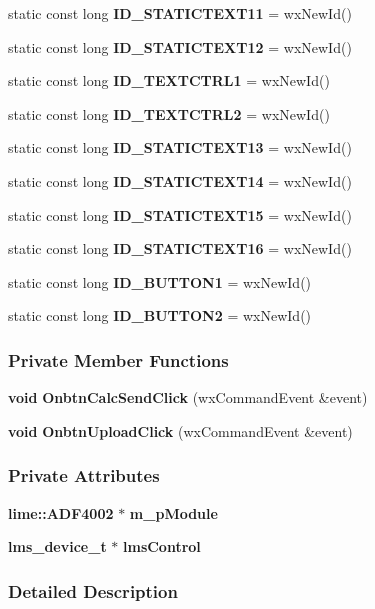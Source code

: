 \begin{DoxyCompactItemize}
\item 
static const long {\bf I\+D\+\_\+\+S\+T\+A\+T\+I\+C\+T\+E\+X\+T11} = wx\+New\+Id()
\item 
static const long {\bf I\+D\+\_\+\+S\+T\+A\+T\+I\+C\+T\+E\+X\+T12} = wx\+New\+Id()
\item 
static const long {\bf I\+D\+\_\+\+T\+E\+X\+T\+C\+T\+R\+L1} = wx\+New\+Id()
\item 
static const long {\bf I\+D\+\_\+\+T\+E\+X\+T\+C\+T\+R\+L2} = wx\+New\+Id()
\item 
static const long {\bf I\+D\+\_\+\+S\+T\+A\+T\+I\+C\+T\+E\+X\+T13} = wx\+New\+Id()
\item 
static const long {\bf I\+D\+\_\+\+S\+T\+A\+T\+I\+C\+T\+E\+X\+T14} = wx\+New\+Id()
\item 
static const long {\bf I\+D\+\_\+\+S\+T\+A\+T\+I\+C\+T\+E\+X\+T15} = wx\+New\+Id()
\item 
static const long {\bf I\+D\+\_\+\+S\+T\+A\+T\+I\+C\+T\+E\+X\+T16} = wx\+New\+Id()
\item 
static const long {\bf I\+D\+\_\+\+B\+U\+T\+T\+O\+N1} = wx\+New\+Id()
\item 
static const long {\bf I\+D\+\_\+\+B\+U\+T\+T\+O\+N2} = wx\+New\+Id()
\end{DoxyCompactItemize}
\subsubsection*{Private Member Functions}
\begin{DoxyCompactItemize}
\item 
{\bf void} {\bf Onbtn\+Calc\+Send\+Click} (wx\+Command\+Event \&event)
\item 
{\bf void} {\bf Onbtn\+Upload\+Click} (wx\+Command\+Event \&event)
\end{DoxyCompactItemize}
\subsubsection*{Private Attributes}
\begin{DoxyCompactItemize}
\item 
{\bf lime\+::\+A\+D\+F4002} $\ast$ {\bf m\+\_\+p\+Module}
\item 
{\bf lms\+\_\+device\+\_\+t} $\ast$ {\bf lms\+Control}
\end{DoxyCompactItemize}


\subsubsection{Detailed Description}


